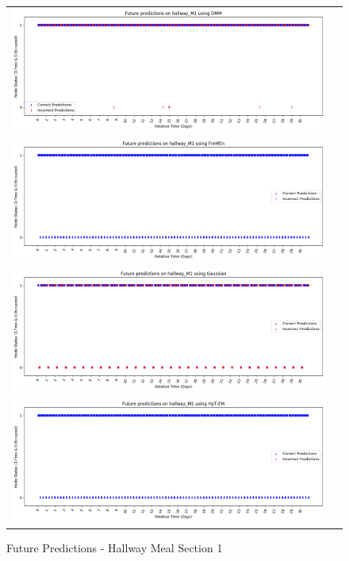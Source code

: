 \begin{center}
\begin{figure}[!Hp]
  \begin{tabular}{cc}
    {\includegraphics[width = 6in]{images/results/Future_hallway_M1_DMM.png}} \\
    {\includegraphics[width = 6in]{images/results/Future_hallway_M1_FreMEn.png}} \\
    {\includegraphics[width = 6in]{images/results/Future_hallway_M1_Gaussian.png}} \\
    {\includegraphics[width = 6in]{images/results/Future_hallway_M1_HyT-EM.png}} \\
  \end{tabular}
  \caption{Future Predictions - Hallway Meal Section 1}
\end{figure}


\end{center}
